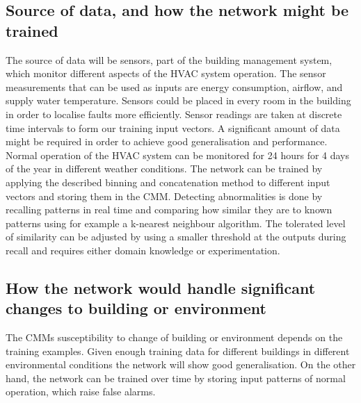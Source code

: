 \documentclass[a4paper, 11pt]{article}
\begin{document}
\subsection{Source of data, and how the network might be trained}
The source of data will be sensors, part of the building management system, which monitor different aspects of the HVAC system operation. The sensor measurements that can be used as inputs are energy consumption, airflow, and supply water temperature. Sensors could be placed in every room in the building in order to localise faults more efficiently. Sensor readings are taken at discrete time intervals to form our training input vectors. A significant amount of data might be required in order to achieve good generalisation and performance. Normal operation of the HVAC system can be monitored for 24 hours for 4 days of the year in different weather conditions. The network can be trained by applying the described binning and concatenation method to different input vectors and storing them in the CMM. Detecting abnormalities is done by recalling patterns in real time and comparing how similar they are to known patterns using for example a k-nearest neighbour algorithm. The tolerated level of similarity can be adjusted by using a smaller threshold at the outputs during recall and requires either domain knowledge or experimentation. 
\subsection{How the network would handle significant changes to building or environment}
The CMMs susceptibility to change of building or environment depends on the training examples. Given enough training data for different buildings in different environmental conditions the network will show good generalisation. On the other hand, the network can be trained over time by storing input patterns of normal operation, which raise false alarms.





\pagebreak
\appendix
\appendixpage


\end{document}
